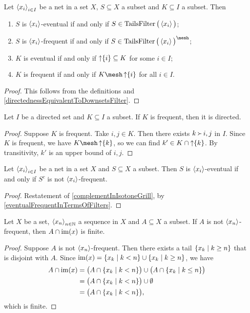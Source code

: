 \begin{lemma} \label{eventualFrequentInTermsOfFilters}
Let $\left\langle x_i \right\rangle_{i\in I}$ be a net in a set $X$, $S\subseteq X$ a subset and $K\subseteq I$ a subset. Then
\begin{enumerate}
\item $S$ is $\left\langle x_i \right\rangle$-eventual \textup{if and only if} $S\in \operatorname{TailsFilter}\big(\left\langle x_i \right\rangle\big)$;
\item $S$ is $\left\langle x_i \right\rangle$-frequent \textup{if and only if} $S\in \TailsFilter\big(\seq{x_i}\big)^\mesh$;
\item $K$ is eventual \textup{if and only if} $\operatorname{\uparrow}\{i\}\subseteq K$ for some $i\in I$;
\item $K$ is frequent \textup{if and only if} $K\mesh \upset\{i\}$ for all $i\in I$.
\end{enumerate}
\end{lemma}
\begin{proof}
This follows from the definitions and \ref{directednessEquivalentToDownsetsFilter}.
\end{proof}

\begin{lemma} \label{frequentImpliesDirected}
Let $I$ be a directed set and $K\subseteq I$ a subset. If $K$ is frequent, then it is directed. 
\end{lemma}
\begin{proof}
Suppose $K$ is frequent. Take $i,j\in K$. Then there exists $k \Yright i,j$ in $I$. Since $K$ is frequent, we have $K\mesh \upset\{k\}$, so we can find $k'\in K \cap \operatorname{\uparrow}\{k\}$. By transitivity, $k'$ is an upper bound of $i,j$.
\end{proof}

\begin{lemma} \label{eventualComplementNotFrequent}
Let $\left\langle x_i \right\rangle_{i\in I}$ be a net in a set $X$ and $S\subseteq X$ a subset. Then $S$ is $\left\langle x_i \right\rangle$-eventual \textup{if and only if} $S^c$ is not $\left\langle x_i \right\rangle$-frequent.
\end{lemma}
\begin{proof}
Restatement of \ref{complementInIsotoneGrill}, by \ref{eventualFrequentInTermsOfFilters}.
\end{proof}

\begin{lemma} \label{sequenceInfrequentImpliesFinite}
Let $X$ be a set, $\left\langle x_n \right\rangle_{n\in \mathbb{N}}$ a sequence in $X$ and $A\subseteq X$ a subset. If $A$ is not $\left\langle x_n \right\rangle$-frequent, then $A\cap \operatorname{im}(x)$ is finite.
\end{lemma}
\begin{proof}
Suppose $A$ is not $\left\langle x_n \right\rangle$-frequent. Then there exists a tail $\setbuilder{x_k}{k\geq n}$ that is disjoint with $A$. Since $\im(x) = \setbuilder{x_k}{k < n} \cup \setbuilder{x_k}{k\geq n}$, we have
\begin{align*}
A\cap \im(x) &= \big(A \cap \setbuilder{x_k}{k < n}\big) \cup \big(A \cap \setbuilder{x_k}{k \leq n}\big) \\
&= \big(A \cap \setbuilder{x_k}{k < n}\big) \cup \emptyset \\
&= \big(A \cap \setbuilder{x_k}{k < n}\big),
\end{align*}
which is finite.
\end{proof}

